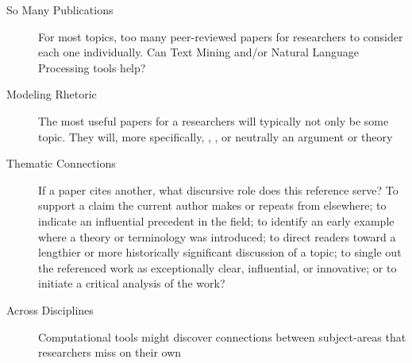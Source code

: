 \begin{frame}{}
\hspace{50pt}\begin{minipage}{.815\textwidth}
{\LARGE {}\selectfont \setlength{\leftmargini}{3pt}\begin{description}
\item[So Many Publications] {} For most topics, too many peer-reviewed papers for 
researchers to consider each one individually.  Can Text Mining and/or Natural Language Processing tools help?    
\vspace{8pt}
\item[Modeling Rhetoric] {} The most useful papers for a researchers will 
typically not only be  some topic.  They will, more specifically, 
, , or neutrally  an argument or theory 
\vspace{8pt}
\item[Thematic Connections] {} If a paper cites another, what discursive role does this 
reference serve?  To support a claim the current author makes or repeats from elsewhere; 
to indicate an influential precedent in the field; to identify an early example where 
a theory or terminology was introduced; to direct readers toward a lengthier or 
more historically significant discussion of a topic;
 to single out the referenced work as exceptionally clear, influential, 
or innovative; or to initiate a critical analysis of the work?  
\vspace{8pt}
\item[Across Disciplines] {} Computational tools might discover connections 
between subject-areas that researchers miss on their own  
\end{description}}\end{minipage}


\end{frame}


